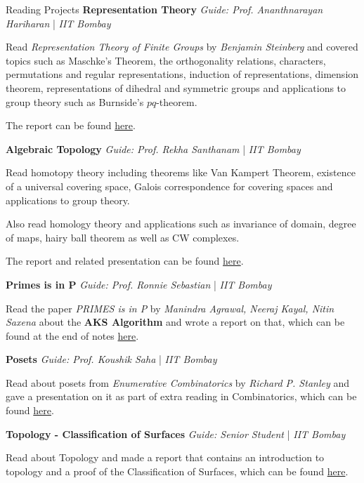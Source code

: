 \begin{rubric}{Reading Projects}
\entry*[2021] \textbf{Representation Theory} \hfill \emph{Guide: Prof. Ananthnarayan Hariharan} | \emph{IIT Bombay}
	
	Read \emph{Representation Theory of Finite Groups} by \emph{Benjamin Steinberg} and covered topics such as Maschke's Theorem, the orthogonality relations, characters, permutations and regular representations, induction of representations, dimension theorem, representations of dihedral and symmetric groups and applications to group theory such as Burnside's $pq$-theorem. 

	The report can be found \href{https://aryamanmaithani.github.io/math/rep-theory/Notes.pdf}{here}.

\entry*[2020] \textbf{Algebraic Topology}  \hfill \emph{Guide: Prof. Rekha Santhanam} | \emph{IIT Bombay}

	Read homotopy theory including theorems like Van Kampert Theorem, existence of a universal covering space, Galois correspondence for covering spaces and applications to group theory.

	Also read homology theory and applications such as invariance of domain, degree of maps, hairy ball theorem as well as CW complexes.

	The report and related presentation can be found \href{https://aryamanmaithani.github.io/math/alg-top/}{here}.

\entry*[2020] \textbf{Primes is in P} \hfill \emph{Guide: Prof. Ronnie Sebastian} | \emph{IIT Bombay}

	Read the paper \emph{PRIMES is in P} by \emph{Manindra Agrawal, Neeraj Kayal, Nitin Saxena} about the \textbf{AKS Algorithm} and wrote a report on that, which can be found at the end of notes \href{http://www.math.iitb.ac.in/~ronnie/Spring2020/Lecture-Notes-Galois-Theory.pdf}{here}.


\entry*[2019] \textbf{Posets} \hfill \emph{Guide: Prof. Koushik Saha} | \emph{IIT Bombay}

	Read about posets from \emph{Enumerative Combinatorics} by \emph{Richard P. Stanley} and gave a presentation on it as part of extra reading in Combinatorics, which can be found \href{https://aryamanmaithani.github.io/math/posets/}{here}.

\entry*[2019] \textbf{Topology - Classification of Surfaces} \hfill \emph{Guide: Senior Student} | \emph{IIT Bombay}

	Read about Topology and made a report that contains an introduction to topology and a proof of the Classification of Surfaces, which can be found \href{https://aryamanmaithani.github.io/math/classification-of-surfaces/Classification%20of%20Surfaces.pdf}{here}.
\end{rubric}